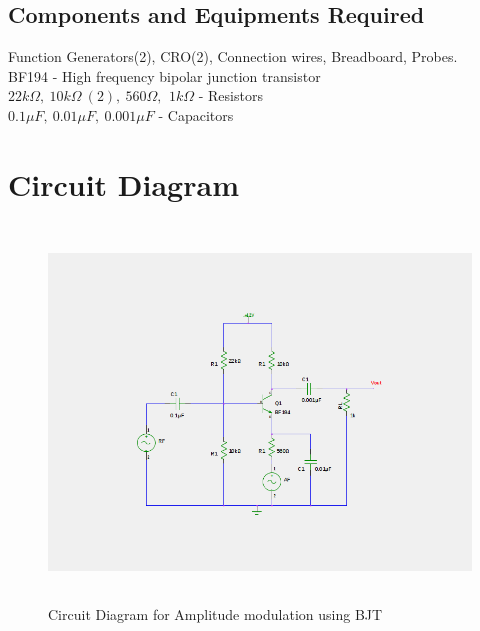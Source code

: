 \documentclass{book}
\begin{document}
\subsection*{Components and Equipments Required}
Function Generators(2), CRO(2), Connection wires, Breadboard, Probes.
\\BF194 - High frequency bipolar junction transistor
\\ $22k\Omega,\  10k\Omega\ (2),\ 560\Omega,\,\ 1k\Omega $ - Resistors
\\ $ 0.1\mu F,\ 0.01\mu F, \ 0.001\mu F $ - Capacitors
\\ 
\section*{Circuit Diagram}
\begin{figure}[h]
\includegraphics[width=15cm, height=10cm, trim=5cm 3.5cm 4cm 3.5cm, clip=true]{AM.png}
\caption{Circuit Diagram for Amplitude modulation using BJT}

\end{figure}
\end{document}
